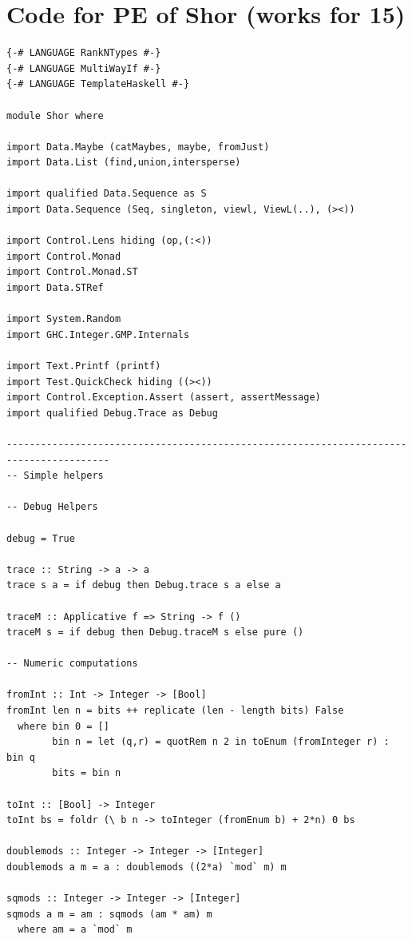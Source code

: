 \documentclass{article}
\begin{document}

\appendix

\section{Code for PE of Shor (works for 15)}

\begin{verbatim}
{-# LANGUAGE RankNTypes #-}
{-# LANGUAGE MultiWayIf #-}
{-# LANGUAGE TemplateHaskell #-}

module Shor where

import Data.Maybe (catMaybes, maybe, fromJust)
import Data.List (find,union,intersperse)

import qualified Data.Sequence as S
import Data.Sequence (Seq, singleton, viewl, ViewL(..), (><))

import Control.Lens hiding (op,(:<))
import Control.Monad 
import Control.Monad.ST
import Data.STRef

import System.Random
import GHC.Integer.GMP.Internals
  
import Text.Printf (printf)
import Test.QuickCheck hiding ((><))
import Control.Exception.Assert (assert, assertMessage)
import qualified Debug.Trace as Debug

----------------------------------------------------------------------------------------
-- Simple helpers

-- Debug Helpers

debug = True

trace :: String -> a -> a
trace s a = if debug then Debug.trace s a else a

traceM :: Applicative f => String -> f ()
traceM s = if debug then Debug.traceM s else pure ()

-- Numeric computations

fromInt :: Int -> Integer -> [Bool]
fromInt len n = bits ++ replicate (len - length bits) False 
  where bin 0 = []
        bin n = let (q,r) = quotRem n 2 in toEnum (fromInteger r) : bin q
        bits = bin n

toInt :: [Bool] -> Integer
toInt bs = foldr (\ b n -> toInteger (fromEnum b) + 2*n) 0 bs

doublemods :: Integer -> Integer -> [Integer]
doublemods a m = a : doublemods ((2*a) `mod` m) m

sqmods :: Integer -> Integer -> [Integer]
sqmods a m = am : sqmods (am * am) m
  where am = a `mod` m


\end{verbatim}
\end{document}
